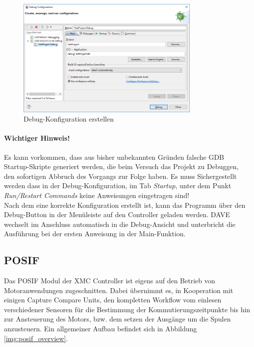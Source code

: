 \begin{figure}[ht]
\centering
\includegraphics[width=0.8\textwidth]{sensor/dave_debugConfig.PNG}
\caption{Debug-Konfiguration erstellen}
\label{img:dave_debugConfig}
\end{figure}

\paragraph{Wichtiger Hinweis!} Es kann vorkommen, dass aus bisher unbekannten Gründen falsche GDB Startup-Skripte generiert werden, die beim Versuch das Projekt zu Debuggen, den sofortigen Abbruch des Vorgangs zur Folge haben. Es muss Sichergestellt werden dass in der Debug-Konfiguration, im Tab \textit{Startup}, unter dem Punkt \textit{Run/Restart Commands} keine Anweisungen eingetragen sind! \\

\noindent
Nach dem eine korrekte Konfiguration erstellt ist, kann das Programm über den Debug-Button in der Menüleiste auf den Controller geladen werden. DAVE wechselt im Anschluss automatisch in die Debug-Ansicht und unterbricht die Ausführung bei der ersten Anweisung in der Main-Funktion.

\subsection{POSIF}
\label{lbl:sensor_posif}
Das POSIF Modul der XMC Controller ist eigens auf den Betrieb von Motoranwendungen zugeschnitten. Dabei übernimmt es, in Kooperation mit einigen Capture Compare Units, den kompletten Workflow vom einlesen verschiedener Sensoren für die Bestimmung der Kommutierungszeitpunkte bis hin zur Ansteuerung des Motors, bzw. dem setzen der Ausgänge um die Spulen anzusteuern. Ein allgemeiner Aufbau befindet sich in Abbildung \ref{img:posif_overview}.


